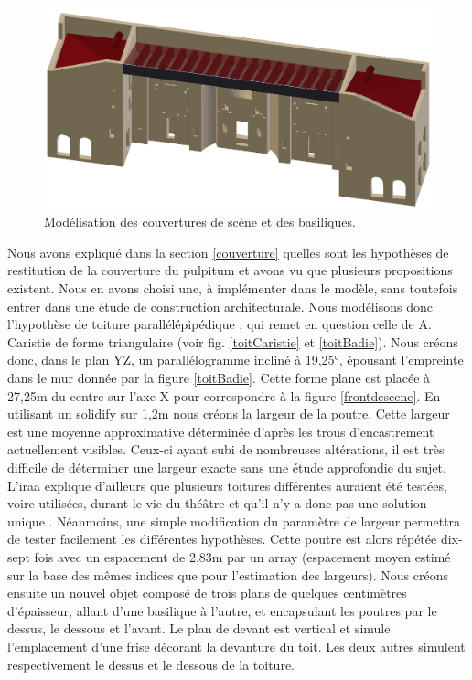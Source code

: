 \begin{figure}[!h] \centering
	\includegraphics[width=\linewidth]{images/modCouvertures}
	\caption{Modélisation des couvertures de scène et des basiliques.} 
	\label{modCouvertures} 
\end{figure} 
Nous avons expliqué dans la section \ref{couverture} quelles sont les hypothèses de restitution de la couverture du \gls{pulpitum} et avons vu que plusieurs propositions existent. Nous en avons choisi une, à implémenter dans le modèle, sans toutefois entrer dans une étude de construction architecturale. Nous modélisons donc l'hypothèse de toiture parallélépipédique \cite[Chap. I, sect. 6]{orangeTxt}, qui remet en question celle de A. Caristie de forme triangulaire (voir fig. \ref{toitCaristie} et \ref{toitBadie}). Nous créons donc, dans le plan YZ, un parallélogramme incliné à 19,25°, épousant l'empreinte dans le mur donnée par la figure \ref{toitBadie}. Cette forme plane est placée à 27,25m du centre sur l'axe X pour correspondre à la figure \ref{frontdescene}. En utilisant un \gls{solidify} sur 1,2m nous créons la largeur de la poutre. Cette largeur est une moyenne approximative déterminée d'après les trous d'encastrement actuellement visibles. Ceux-ci ayant subi de nombreuses altérations, il est très difficile de déterminer une largeur exacte sans une étude approfondie du sujet. L'\gls{iraa} explique d'ailleurs que plusieurs toitures différentes auraient été testées, voire utilisées, durant le vie du théâtre et qu'il n'y a donc pas une solution unique \cite[p. 34]{orangeTxt}. Néanmoins, une simple modification du paramètre de largeur permettra de tester facilement les différentes hypothèses. Cette poutre est alors répétée dix-sept fois avec un espacement de 2,83m par un \gls{array} (espacement moyen estimé sur la base des mêmes indices que pour l'estimation des largeurs). Nous créons ensuite un nouvel objet composé de trois plans de quelques centimètres d'épaisseur, allant d'une basilique à l'autre, et encapsulant les poutres par le dessus, le dessous et l'avant. Le plan de devant est vertical et simule l'emplacement d'une frise décorant la devanture du toit. Les deux autres simulent respectivement le dessus et le dessous de la toiture.

